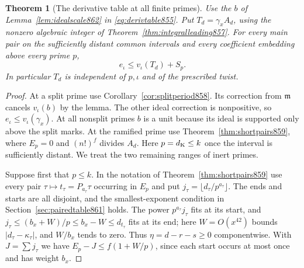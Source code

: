 \documentclass[a4paper,11pt]{article}
\newtheorem{theorem}[proposition]{Theorem}
\theoremstyle{definition}
\theoremstyle{remark}
\numberwithin{equation}{section}
\begin{document}
\begin{theorem}[The derivative table at all finite primes]
\leavevmode\label{thm:allprimetable862}
Use the \(b\) of Lemma~\ref{lem:idealscale862} in
\eqref{eq:derivtable855}. Put \(T_d=\gamma_x A_d\), using
the nonzero algebraic integer of Theorem~\ref{thm:integralleading857}.
For every main pair on the sufficiently distant common intervals
and every coefficient embedding above every prime \(p\),
\begin{equation}
                     e_\iota\le v_\iota(T_d)+S_p .
 \label{eq:allprimetable862}
\end{equation}
In particular \(T_d\) is independent of \(p,\iota\) and of the
prescribed twist.
\end{theorem}
\begin{proof}
At a split prime use Corollary~\ref{cor:splitperiod858}.
Its correction from \(\mathfrak m\) cancels \(v_\iota(b)\)
by the lemma. The other ideal correction is nonpositive,
so \(e_\iota\le v_\iota(\gamma_x)\). At all nonsplit primes
\(b\) is a unit because its ideal is supported only above the
split marks. At the ramified prime use Theorem~\ref{thm:shortpairs859},
where \(E_p=0\) and \((n!)^f\) divides \(A_d\).
Here \(p=d_{\rm K}\le k\) once the interval is sufficiently
distant. We treat the two remaining ranges of inert primes.

Suppose first that \(p\le k\). In the notation of
Theorem~\ref{thm:shortpairs859} use every pair
\(\tau\mapsto t_\tau=P_{a_\tau}\tau\) occurring in \(E_p\)
and put \(j_\tau=\lfloor d_\tau/p^{a_\tau}\rfloor\).
The ends and starts are all disjoint, and the smallest-exponent
condition in Section~\ref{sec:pairedtable861} holds.
The power \(p^{a_\tau}j_\tau\) fits at its start, and
\(j_\tau\le(b_x+W)/p\le b_x-W\le d_{t_\tau}\) fits
at its end; here \(W=O(x^{42})\) bounds
\(|d_\tau-\kappa_\tau|\), and \(W/b_x\) tends to zero.
Thus \(\eta=d-r-s\ge0\) componentwise. With \(J=\sum j_\tau\)
we have \(E_p-J\le f(1+W/p)\), since each start occurs
at most once and has weight \(b_x\).


\end{proof}
\end{document}
